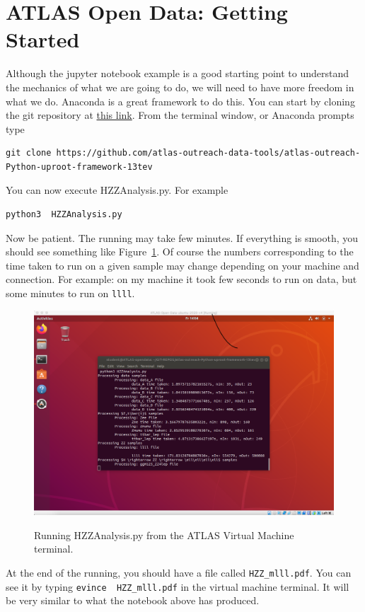 \section{ATLAS Open Data: Getting Started} 


Although the jupyter notebook example is a good starting point to understand the mechanics of what we are going to do, we will need to have more freedom in what we do. Anaconda is a great framework to do this. You can start by cloning the git repository at \href{https://github.com/atlas-outreach-data-tools/atlas-outreach-Python-uproot-framework-13tev}{this link}. From the terminal window, or Anaconda prompts type

\begin{verbatim}
git clone https://github.com/atlas-outreach-data-tools/atlas-outreach-Python-uproot-framework-13tev
\end{verbatim}

You can now execute HZZAnalysis.py. For example

\begin{verbatim}
python3  HZZAnalysis.py
\end{verbatim}

Now be patient. The running may take few minutes. If everything is smooth, you should see something like Figure~\ref{fig:running_HZZ}. Of course the numbers corresponding to the time taken to run on a given sample may change depending on your machine and connection. For example: on my machine it took few seconds to run on data, but some minutes to run on \verb|llll|. 

\begin{figure}[tb] 
	\centering
	\includegraphics[width=0.7\columnwidth]{Figures/Running_HZZ.png}
	\label{fig:running_HZZ}
	\caption{Running HZZAnalysis.py from the ATLAS Virtual Machine terminal.}
\end{figure}

At the end of the running, you should have a file called \verb|HZZ_mlll.pdf|. You can see it by typing \verb|evince  HZZ_mlll.pdf| in the virtual machine terminal. It will be very similar to what the notebook above has produced. 


